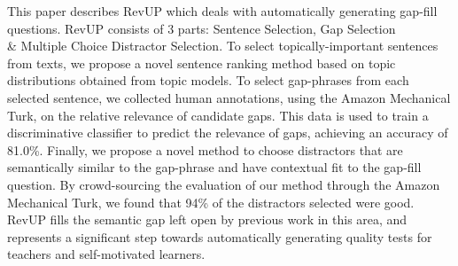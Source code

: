 This paper describes RevUP which deals with automatically generating gap-fill questions. RevUP consists of 3 parts: Sentence Selection, Gap Selection \\& Multiple Choice Distractor Selection. To select topically-important sentences from texts, we propose a novel sentence ranking method based on topic distributions obtained from topic models. To select gap-phrases from each selected sentence, we collected human annotations, using the Amazon Mechanical Turk, on the relative relevance of candidate gaps. This data is used to train a discriminative classifier to predict the relevance of gaps, achieving an accuracy of 81.0\%. Finally, we propose a novel method to choose distractors that are semantically similar to the gap-phrase and have contextual fit to the gap-fill question. By crowd-sourcing the evaluation of our method through the Amazon Mechanical Turk, we found that 94\% of the distractors selected were good. RevUP fills the semantic gap left open by previous work in this area, and represents a significant step towards automatically generating quality tests for teachers and self-motivated learners.
